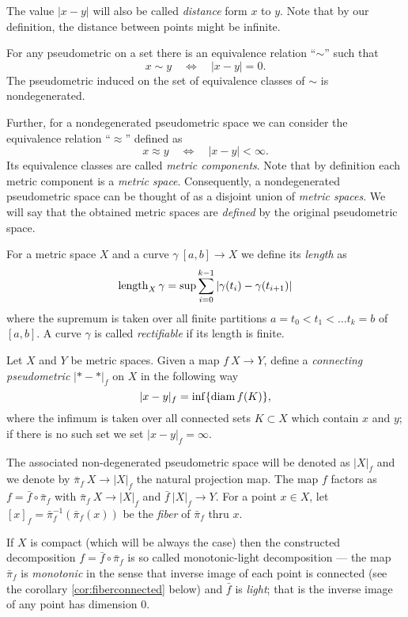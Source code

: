 \documentclass{article}
\begin{document}
The value $|x-y|$ will also be called \emph{distance} form $x$ to $y$.
Note that by our definition, the distance between points might be infinite.

For any pseudometric on a set there is an equivalence relation ``$\sim$'' such that 
\[x\sim y\quad\iff\quad|x-y|=0.\]
The pseudometric induced  on the set of equivalence classes of $\sim$ is nondegenerated.

Further, for a nondegenerated pseudometric space we can consider the equivalence relation ``$\approx$'' defined as 
\[x\approx y\quad\iff\quad|x-y|<\infty.\]
Its equivalence classes are called \emph{metric components}.
Note that by definition each metric component is a \emph{metric space}.
Consequently, a nondegenerated pseudometric space can be thought of as a disjoint union of \emph{metric spaces}.
We will say that the obtained metric spaces are \emph{defined} by the  original pseudometric space.

For a metric space $X$ and a curve $\gamma\:[a,b]\to X$ we define its {\em length} as
\[\mathop{\rm length}\nolimits_X\gamma=\sup\sum_{i=0}^{k-1} |\gamma(t_i)-\gamma(t_{i+1})|\]
where the supremum is taken over all finite partitions ${a=t_0<t_1<\ldots t_k=b}$ of $[a,b]$. 
A curve $\gamma$ is called {\em rectifiable} if its length is finite.

Let $X$ and $Y$ be metric spaces.
Given a map $f\:X\to Y$,
define a \emph{connecting pseudometric} $|{*}-{*}|_f$ on $X$ in
the following way
\[|x-y|_f=\inf\{\mathop{\rm diam}\nolimits f(K)\},\]
where the infimum is taken over all connected sets $K\subset X$ which contain $x$ and $y$;
if there is no such set we set $|x-y|_f=\infty$. 

The associated non-degenerated pseudometric space will be
denoted as $|X|_f$ and we denote by $\bar\pi_f\:X\to |X|_f$ the natural projection map.
The map $f$ factors as $f=\bar f\circ \bar\pi_f$ with $\bar\pi_f\:X\to|X|_f$ and $\bar f\:|X|_f\to Y$.
For a point $x\in X$, let $[x]_f=\bar\pi_f^{-1}(\bar\pi_f(x))$ be the \emph{fiber} of $\bar\pi_f$ thru $x$.

If $X$ is compact (which will be always the case)
then the constructed decomposition $f=\bar f\circ \bar\pi_f$ is so called monotonic-light decomposition --- the map $\bar\pi_f$ is \emph{monotonic}
in the sense that inverse image of each point is connected (see the corollary \ref{cor:fiberconnected} below)
and $\bar f$ is \emph{light}; 
that is the inverse image of any point has dimension $0$.
\end{document}

